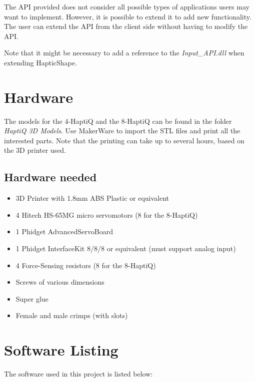 \documentclass[a4paper]{article}
\begin{document}
The API provided does not consider all possible types of applications users may want to implement. However, it is possible to extend it to add new functionality. The user can extend the API from the client side without having to modify the API. 

Note that it might be necessary to add a reference to the \textit{Input\_API.dll} when extending HapticShape.

\newpage
\section{Hardware}

The models for the 4-HaptiQ and the 8-HaptiQ can be found in the folder \textit{HaptiQ 3D Models}. Use MakerWare to import the STL files and print all the interested parts. Note that the printing can take up to several hours, based on the 3D printer used. 

\subsection{Hardware needed}

\begin{itemize}
	\item 3D Printer with 1.8mm ABS Plastic or equivalent
    \item 4 Hitech HS-65MG micro servomotors (8 for the 8-HaptiQ)
    \item 1 Phidget AdvancedServoBoard
    \item 1 Phidget InterfaceKit 8/8/8 or equivalent (must support analog input)
    \item 4 Force-Sensing resistors (8 for the 8-HaptiQ)
    \item Screws of various dimensions 
    \item Super glue
    \item Female and male crimps (with slots)
\end{itemize}

\section{Software Listing}

The software used in this project is listed below:
\end{document}
